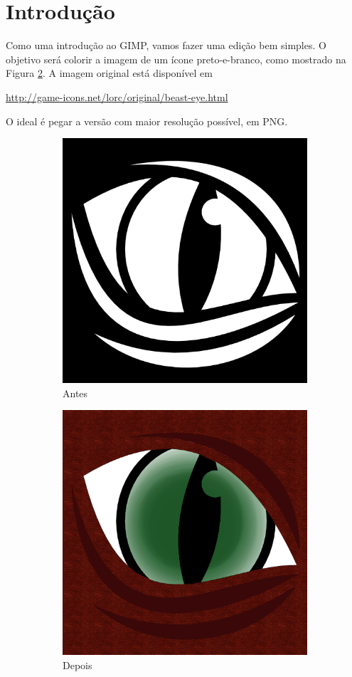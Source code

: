 \documentclass[12pt,onecolumn]{article}
\begin{document}
\clearpage
\section{Introdução}
  Como uma introdução ao GIMP, vamos fazer uma edição bem simples. O objetivo
  será colorir a imagem de um ícone preto-e-branco, como mostrado na Figura
  \ref{fig:intro}. A imagem original está disponível em
  
  \begin{center}
    \url{http://game-icons.net/lorc/original/beast-eye.html}      
  \end{center}
  
   O ideal é pegar a versão com maior resolução possível, em PNG.

  \begin{figure}
    \centering
    \begin{subfigure}{.5\textwidth}
      \centering
      \includegraphics[width=.7\linewidth]{beast-eye.png}
      \caption{Antes}
      \label{fig:ex1_before}
    \end{subfigure}%
    \begin{subfigure}{.5\textwidth}
      \centering
      \includegraphics[width=.7\linewidth]{draft00.png}
      \caption{Depois}
    \end{subfigure}
    \caption{}
    \label{fig:intro}
  \end{figure}
  
\end{document}
